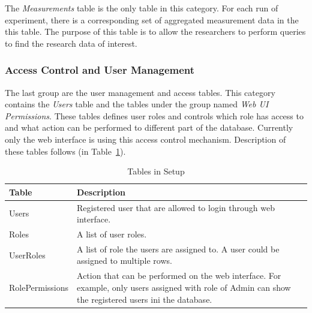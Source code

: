 The \emph{Measurements} table is the only table in this category. For each run of experiment, there is a corresponding set of aggregated measurement data in the  this table. The purpose of this table is to allow the researchers to perform queries to find the research data of interest.


\subsubsection{Access Control and User Management}

The last group are the user management and access tables. This category contains the \emph{Users} table and the tables under the group named \emph{Web UI Permissions}. These tables defines user roles and controls which role has access to and what action can be performed to different part of the database. Currently only the web interface is using this access control mechanism. Description of these tables follows (in Table~\ref{tb_tables_in_access}).

\begin{table}[h]
\centering
\caption{Tables in Setup}\label{tb_tables_in_access}
\begin{tabular}{l p{12cm}} \hline
{\bf Table}         & {\bf Description}\\ \hline
Users           & Registered user that are allowed to login through web interface.\\ \hline
Roles           & A list of user roles.\\ \hline
UserRoles       & A list of role the users are assigned to. A user could be assigned to multiple rows. \\ \hline
RolePermissions & Action that can be performed on the web interface. For example, only users assigned with role of Admin can show the registered users ini the database.\\ \hline
\end{tabular}
\end{table}






